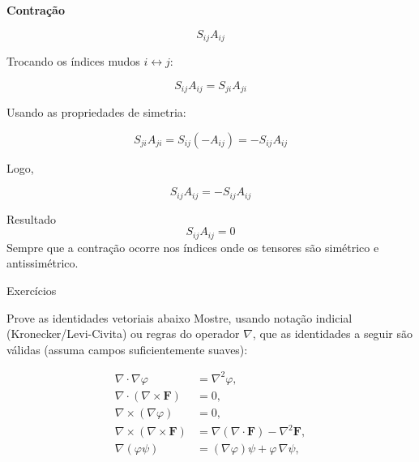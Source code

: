 \documentclass[aspectratio=169]{beamer}
\begin{document}
\begin{frame}

\textbf{Contração}

\begin{equation}
S_{ij}A_{ij}
\end{equation}

Trocando os índices mudos \(i \leftrightarrow j\):

\begin{equation}
S_{ij}A_{ij} = S_{ji}A_{ji}
\end{equation}

Usando as propriedades de simetria:

\begin{equation}
S_{ji}A_{ji} = S_{ij}(-A_{ij}) = -S_{ij}A_{ij}
\end{equation}

Logo,

\begin{equation}
S_{ij}A_{ij} = -S_{ij}A_{ij}
\label{eq:symantisym}
\end{equation}

\begin{alertblock}{Resultado}
\begin{equation}
S_{ij}A_{ij} = 0
\end{equation}
Sempre que a contração ocorre nos índices onde os tensores são
simétrico e antissimétrico.
\end{alertblock}

\end{frame}
\begin{frame}{Exercícios}
\begin{block}{Prove as identidades vetoriais abaixo}
Mostre, usando notação indicial (Kronecker/Levi-Civita) ou regras do operador $\nabla$,
que as identidades a seguir são válidas (assuma campos suficientemente suaves):
\end{block}

\vspace{-0.2cm}
\small
\begin{align}
\nabla\cdot\nabla \varphi &= \nabla^2\varphi,
\tag{1}\label{eq:ex_id_1}\\[0.15cm]
\nabla\cdot(\nabla\times \bm F) &= 0,
\tag{2}\label{eq:ex_id_2}\\[0.15cm]
\nabla\times(\nabla \varphi) &= 0,
\tag{3}\label{eq:ex_id_3}\\[0.15cm]
\nabla\times(\nabla\times \bm F) &= \nabla(\nabla\cdot \bm F)-\nabla^2\bm F,
\tag{4}\label{eq:ex_id_4}\\[0.15cm]
\nabla(\varphi\psi) &= (\nabla\varphi)\psi+\varphi\,\nabla\psi,
\tag{5}\label{eq:ex_id_5}
\end{align}
\normalsize
\end{frame}
\end{document}
